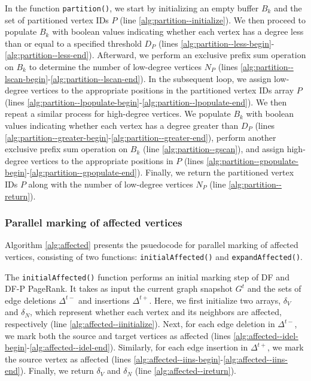 In the function \texttt{partition()}, we start by initializing an empty buffer $B_k$ and the set of partitioned vertex IDs $P$ (line \ref{alg:partition--initialize}). We then proceed to populate $B_k$ with boolean values indicating whether each vertex has a degree less than or equal to a specified threshold $D_P$ (lines \ref{alg:partition--less-begin}-\ref{alg:partition--less-end}). Afterward, we perform an exclusive prefix sum operation on $B_k$ to determine the number of low-degree vertices $N_P$ (lines \ref{alg:partition--lscan-begin}-\ref{alg:partition--lscan-end}). In the subsequent loop, we assign low-degree vertices to the appropriate positions in the partitioned vertex IDs array $P$ (lines \ref{alg:partition--lpopulate-begin}-\ref{alg:partition--lpopulate-end}). We then repeat a similar process for high-degree vertices. We populate $B_k$ with boolean values indicating whether each vertex has a degree greater than $D_P$ (lines \ref{alg:partition--greater-begin}-\ref{alg:partition--greater-end}), perform another exclusive prefix sum operation on $B_k$ (line \ref{alg:partition--gscan}), and assign high-degree vertices to the appropriate positions in $P$ (lines \ref{alg:partition--gpopulate-begin}-\ref{alg:partition--gpopulate-end}). Finally, we return the partitioned vertex IDs $P$ along with the number of low-degree vertices $N_P$ (line \ref{alg:partition--return}).


\subsubsection{Parallel marking of affected vertices}

Algorithm \ref{alg:affected} presents the psuedocode for parallel marking of affected vertices, consisting of two functions: \texttt{initialAffected()} and \texttt{expandAffected()}.

The \texttt{initialAffected()} function performs an initial marking step of DF and DF-P PageRank. It takes as input the current graph snapshot $G^t$ and the sets of edge deletions $\Delta^{t-}$ and insertions $\Delta^{t+}$. Here, we first initialize two arrays, $\delta_V$ and $\delta_N$, which represent whether each vertex and its neighbors are affected, respectively (line \ref{alg:affected--iinitialize}). Next, for each edge deletion in $\Delta^{t-}$, we mark both the source and target vertices as affected (lines \ref{alg:affected--idel-begin}-\ref{alg:affected--idel-end}). Similarly, for each edge insertion in $\Delta^{t+}$, we mark the source vertex as affected (lines \ref{alg:affected--iins-begin}-\ref{alg:affected--iins-end}). Finally, we return $\delta_V$ and $\delta_N$ (line \ref{alg:affected--ireturn}).

